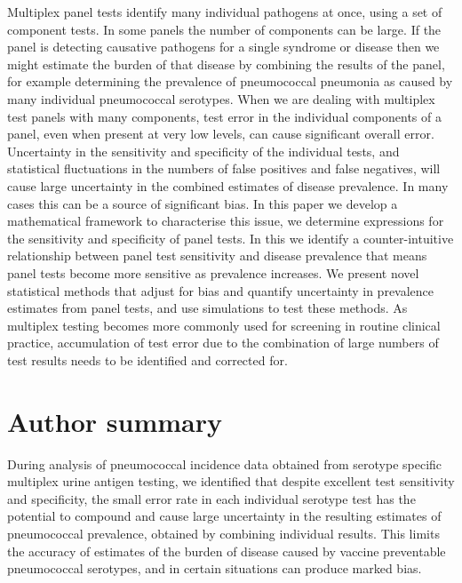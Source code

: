 \documentclass[10pt,letterpaper]{article}
\begin{document}
Multiplex panel tests identify many individual pathogens at once, using a set of component tests. In some panels the number of components can be large. If the panel is detecting causative pathogens for a single syndrome or disease then we might estimate the burden of that disease by combining the results of the panel, for example determining the prevalence of pneumococcal pneumonia as caused by many individual pneumococcal serotypes. When we are dealing with multiplex test panels with many components, test error in the individual components of a panel, even when present at very low levels, can cause significant overall error. Uncertainty in the sensitivity and specificity of the individual tests, and statistical fluctuations in the numbers of false positives and false negatives, will cause large uncertainty in the combined estimates of disease prevalence. In many cases this can be a source of significant bias. In this paper we develop a mathematical framework to characterise this issue, we determine expressions for the sensitivity and specificity of panel tests. In this we identify a counter-intuitive relationship between panel test sensitivity and disease prevalence that means panel tests become more sensitive as prevalence increases. We present novel statistical methods that adjust for bias and quantify uncertainty in prevalence estimates from panel tests, and use simulations to test these methods. As multiplex testing becomes more commonly used for screening in routine clinical practice, accumulation of test error due to the combination of large numbers of test results needs to be identified and corrected for.


\section*{Author summary}

During analysis of pneumococcal incidence data obtained from serotype specific multiplex urine antigen testing, we identified that despite excellent test sensitivity and specificity, the small error rate in each individual serotype test has the potential to compound and cause large uncertainty in the resulting estimates of pneumococcal prevalence, obtained by combining individual results. This limits the accuracy of estimates of the burden of disease caused by vaccine preventable pneumococcal serotypes, and in certain situations can produce marked bias.
\end{document}
